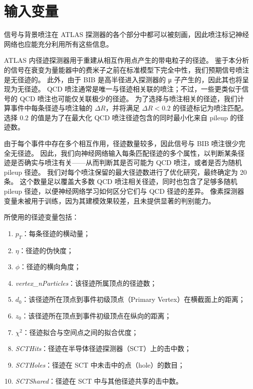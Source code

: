 \section{输入变量}
\label{cpm:NN_variables}

信号与背景喷注在 ATLAS 探测器的各个部分中都可以被刻画，因此喷注标记神经网络也应能充分利用所有这些信息。

ATLAS 内径迹探测器用于重建从相互作用点产生的带电粒子的径迹。
鉴于本分析的信号在衰变为量能器中的费米子之前在标准模型下完全中性，我们预期信号喷注是无径迹的。
此外，由于 BIB 是高半径进入探测器的 μ 子产生的，因此其也将呈现为无径迹。
QCD 喷注通常是唯一与径迹相关联的喷注；不过，一些更类似于信号的 QCD 喷注也可能仅关联极少的径迹。
为了选择与喷注相关的径迹，我们计算事件中每条径迹与喷注轴的 $\Delta R$，并将满足 $\Delta R < 0.2$ 的径迹标记为喷注匹配。
选择 $0.2$ 的值是为了在最大化 QCD 喷注径迹包含的同时最小化来自 pileup 的径迹数。

由于每个事件中存在多个相互作用，径迹数量较多，因此信号与 BIB 喷注很少完全无径迹。
因此，我们向神经网络输入每条匹配径迹的多个属性，以判断某条径迹是否确实与喷注有关——从而判断其是否可能为 QCD 喷注，或者是否为随机 pileup 径迹。
我们对每个喷注保留的最大径迹数进行了优化研究，最终确定为 20 条。
这个数量足以覆盖大多数 QCD 喷注相关径迹，同时也包含了足够多随机 pileup 径迹，以便神经网络学习如何区分它们与 QCD 径迹的差异。
像素探测器变量未被用于训练，因为其建模效果较差，且未提供显著的判别能力。

所使用的径迹变量包括：
\begin{enumerate}
      \item $p_T$：每条径迹的横动量；
      \item $\eta$：径迹的伪快度；
      \item $\phi$：径迹的横向角度；
      \item \textit{vertex\_nParticles}：该径迹所属顶点的径迹数；
      \item $d_0$：该径迹所在顶点到事件初级顶点（Primary Vertex）在横截面上的距离；
      \item $z_0$：该径迹所在顶点到事件初级顶点在纵向的距离；
      \item $\chi^2$：径迹拟合与空间点之间的拟合优度；
      \item \textit{SCTHits}：径迹在半导体径迹探测器（SCT）上的击中数；
      \item \textit{SCTHoles}：径迹在 SCT 中未击中的点（hole）的数目；
      \item \textit{SCTShared}：径迹在 SCT 中与其他径迹共享的击中数。
\end{enumerate}

